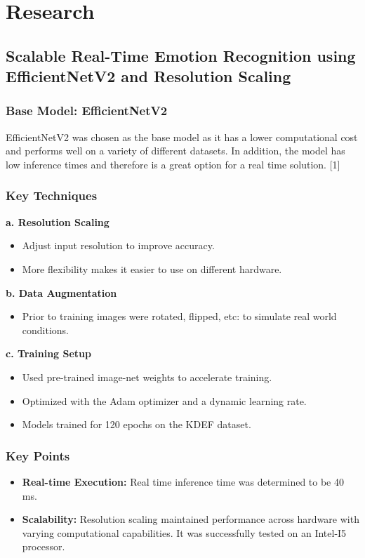 \documentclass{article}
\begin{document}
\section*{Research}

\subsection*{Scalable Real-Time Emotion Recognition using EfficientNetV2 and Resolution Scaling}

\subsubsection*{Base Model: EfficientNetV2}
EfficientNetV2 was chosen as the base model as it has a lower computational cost and performs well on a variety of different datasets.
In addition, the model has low inference times and therefore is a great option for a real time solution. [1]

\subsubsection*{Key Techniques}
\textbf{a. Resolution Scaling}
\begin{itemize}
    \item Adjust input resolution to improve accuracy.
    \item More flexibility makes it easier to use on different hardware.
\end{itemize}

\textbf{b. Data Augmentation}
\begin{itemize}
    \item Prior to training images were rotated, flipped, etc: to simulate real world conditions.
\end{itemize}

\textbf{c. Training Setup}
\begin{itemize}
    \item Used pre-trained image-net weights to accelerate training.
    \item Optimized with the Adam optimizer and a dynamic learning rate.
    \item Models trained for 120 epochs on the KDEF dataset.
\end{itemize}

\subsubsection*{Key Points}
\begin{itemize}
    \item \textbf{Real-time Execution:} Real time inference time was determined to be 40 ms.
    \item \textbf{Scalability:} Resolution scaling maintained performance across hardware with varying computational capabilities. It was successfully tested on an Intel-I5 processor.
\end{itemize}
\end{document}
